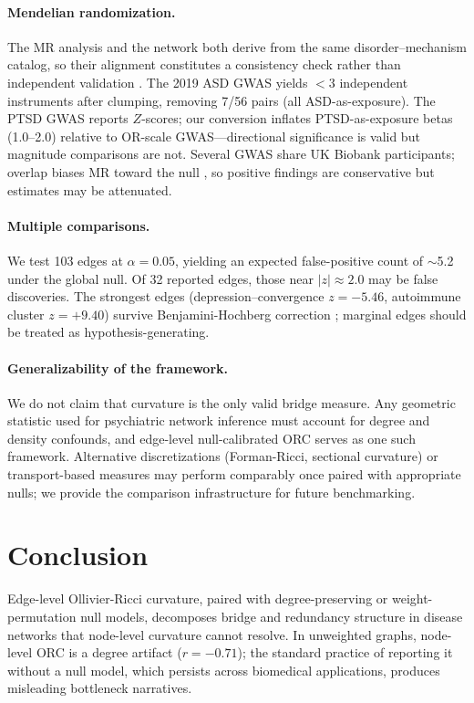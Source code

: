 \documentclass[11pt]{article}
\begin{document}
\paragraph{Mendelian randomization.} The MR analysis and the network both derive from the same disorder--mechanism catalog, so their alignment constitutes a consistency check rather than independent validation \citep{buliksullivan2015atlas, anttila2018analysis}. The 2019 ASD GWAS \citep{grove2019identification} yields $<3$ independent instruments after clumping, removing 7/56 pairs (all ASD-as-exposure). The PTSD GWAS reports $Z$-scores; our conversion inflates PTSD-as-exposure betas (1.0--2.0) relative to OR-scale GWAS---directional significance is valid but magnitude comparisons are not. Several GWAS share UK Biobank participants; overlap biases MR toward the null \citep{hemani2018mrbase}, so positive findings are conservative but estimates may be attenuated.

\paragraph{Multiple comparisons.} We test 103 edges at $\alpha = 0.05$, yielding an expected false-positive count of $\sim$5.2 under the global null. Of 32 reported edges, those near $|z| \approx 2.0$ may be false discoveries. The strongest edges (depression--convergence $z = -5.46$, autoimmune cluster $z = +9.40$) survive Benjamini-Hochberg correction \citep{benjamini1995controlling}; marginal edges should be treated as hypothesis-generating.

\paragraph{Generalizability of the framework.} We do not claim that curvature is the only valid bridge measure. Any geometric statistic used for psychiatric network inference must account for degree and density confounds, and edge-level null-calibrated ORC serves as one such framework. Alternative discretizations (Forman-Ricci, sectional curvature) or transport-based measures may perform comparably once paired with appropriate nulls; we provide the comparison infrastructure for future benchmarking.

\section{Conclusion}

Edge-level Ollivier-Ricci curvature, paired with degree-preserving or weight-permutation null models, decomposes bridge and redundancy structure in disease networks that node-level curvature cannot resolve. In unweighted graphs, node-level ORC is a degree artifact ($r = -0.71$); the standard practice of reporting it without a null model, which persists across biomedical applications, produces misleading bottleneck narratives.
\end{document}
